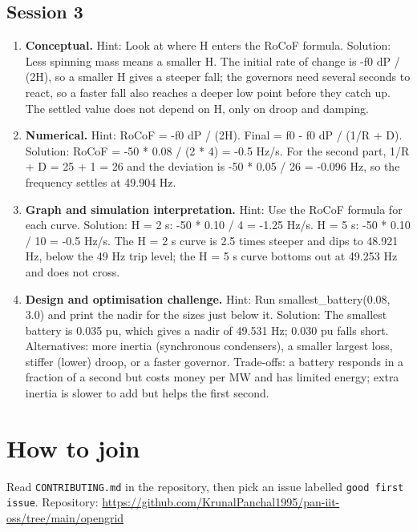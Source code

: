 \documentclass[11pt,a4paper]{article}
\begin{document}
\subsection*{Session 3}
\begin{enumerate}[nosep]
\item \textbf{Conceptual.} Hint: Look at where H enters the RoCoF formula. Solution: Less spinning mass means a smaller H. The initial rate of change is -f0 dP / (2H), so a smaller H gives a steeper fall; the governors need several seconds to react, so a faster fall also reaches a deeper low point before they catch up. The settled value does not depend on H, only on droop and damping.
\item \textbf{Numerical.} Hint: RoCoF = -f0 dP / (2H). Final = f0 - f0 dP / (1/R + D). Solution: RoCoF = -50 * 0.08 / (2 * 4) = -0.5 Hz/s. For the second part, 1/R + D = 25 + 1 = 26 and the deviation is -50 * 0.05 / 26 = -0.096 Hz, so the frequency settles at 49.904 Hz.
\item \textbf{Graph and simulation interpretation.} Hint: Use the RoCoF formula for each curve. Solution: H = 2 s: -50 * 0.10 / 4 = -1.25 Hz/s. H = 5 s: -50 * 0.10 / 10 = -0.5 Hz/s. The H = 2 s curve is 2.5 times steeper and dips to 48.921 Hz, below the 49 Hz trip level; the H = 5 s curve bottoms out at 49.253 Hz and does not cross.
\item \textbf{Design and optimisation challenge.} Hint: Run smallest\_battery(0.08, 3.0) and print the nadir for the sizes just below it. Solution: The smallest battery is 0.035 pu, which gives a nadir of 49.531 Hz; 0.030 pu falls short. Alternatives: more inertia (synchronous condensers), a smaller largest loss, stiffer (lower) droop, or a faster governor. Trade-offs: a battery responds in a fraction of a second but costs money per MW and has limited energy; extra inertia is slower to add but helps the first second.
\end{enumerate}

\section{How to join}
Read \texttt{CONTRIBUTING.md} in the repository, then pick an issue labelled \texttt{good first issue}. Repository: \url{https://github.com/KrunalPanchal1995/pan-iit-oss/tree/main/opengrid}
\end{document}
